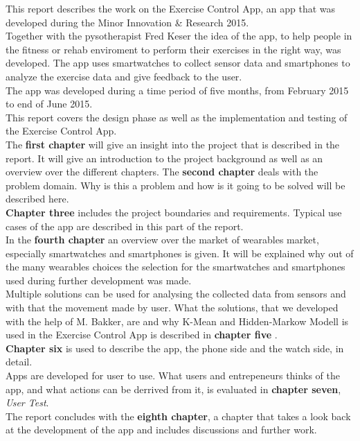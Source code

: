 This report describes the work on the Exercise Control App, an app that was developed during the Minor Innovation \& Research 2015.\\
Together with the pysotherapist Fred Keser the idea of the app, to help people in the fitness or rehab enviroment to perform their exercises in the right way, was developed. The app uses smartwatches to collect sensor data and smartphones to analyze the exercise data and give feedback to the user. \\
The app was developed during a time period of five months, from February 2015 to end of June 2015. \\
This report covers the design phase as well as the implementation and testing of the Exercise Control App.\\
The \textbf{first chapter} will give an insight into the project that is described in the report. It will give an introduction to the project background as well as an overview over the different chapters.
The \textbf{second chapter} deals with the problem domain. Why is this a problem and how is it going to be solved will be described here.\\
\textbf{Chapter three} includes the project boundaries and requirements. Typical use cases of the app are described in this part of the report.
\\
In the \textbf{fourth chapter} an overview over the market of wearables market, especially smartwatches and smartphones is given. It will be explained why out of the many wearables choices the selection for the smartwatches and smartphones used during further development was made.
\\
 Multiple solutions can be used for analysing the collected data from sensors and with that the movement made by user. What the solutions, that we developed with the help of M. Bakker, are and why K-Mean and Hidden-Markow Modell is used in the Exercise Control App is described in \textbf{chapter five} .
\\
\textbf{Chapter six} is used to describe the app, the phone side and the watch side, in detail.
\\
Apps are developed for user to use. What users and entrepeneurs thinks of the app, and what actions can be derrived from it, is evaluated in \textbf{chapter seven}, \emph{User Test}.
\\
The report concludes with the \textbf{eighth chapter}, a chapter that takes a look back at the development of the app and includes discussions and further work.
